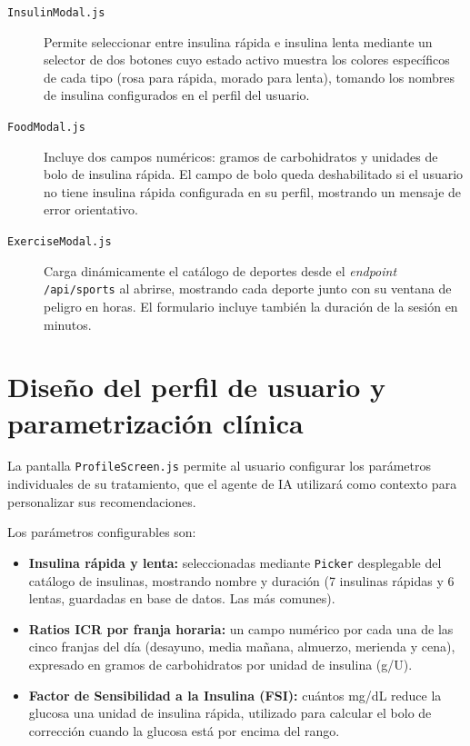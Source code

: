 \begin{description}
    \item[\texttt{InsulinModal.js}] Permite seleccionar entre insulina rápida e
    insulina lenta mediante un selector de dos botones cuyo estado activo muestra
    los colores específicos de cada tipo (rosa para rápida, morado para lenta),
    tomando los nombres de insulina configurados en el perfil del usuario.

    \item[\texttt{FoodModal.js}] Incluye dos campos numéricos: gramos de
    carbohidratos y unidades de bolo de insulina rápida. El campo de bolo queda
    deshabilitado si el usuario no tiene insulina rápida configurada en su perfil,
    mostrando un mensaje de error orientativo.

    \item[\texttt{ExerciseModal.js}] Carga dinámicamente el catálogo de deportes
    desde el \textit{endpoint} \texttt{/api/sports} al abrirse, mostrando cada
    deporte junto con su ventana de peligro en horas. El formulario incluye también
    la duración de la sesión en minutos.
\end{description}

\section{Diseño del perfil de usuario y parametrización clínica}
\label{sec:diseno-perfil}

La pantalla \texttt{ProfileScreen.js} permite al usuario configurar los parámetros
individuales de su tratamiento, que el agente de IA utilizará como contexto para
personalizar sus recomendaciones.

Los parámetros configurables son:

\begin{itemize}
    \item \textbf{Insulina rápida y lenta:} seleccionadas mediante \texttt{Picker}
          desplegable del catálogo de insulinas, mostrando nombre y duración (7 insulinas rápidas y 6 lentas, guardadas en base de datos. Las más comunes).
    \item \textbf{Ratios ICR por franja horaria:} un campo numérico por cada una de
          las cinco franjas del día (desayuno, media mañana, almuerzo, merienda y cena),
          expresado en gramos de carbohidratos por unidad de insulina (g/U).
    \item \textbf{Factor de Sensibilidad a la Insulina (FSI):} cuántos mg/dL reduce
          la glucosa una unidad de insulina rápida, utilizado para calcular el bolo
          de corrección cuando la glucosa está por encima del rango.
\end{itemize}

